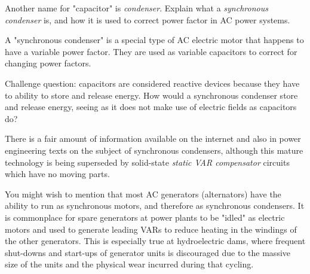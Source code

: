 

Another name for "capacitor" is {\it condenser}.  Explain what a {\it synchronous condenser} is, and how it is used to correct power factor in AC power systems.







A "synchronous condenser" is a special type of AC electric motor that happens to have a variable power factor.  They are used as variable capacitors to correct for changing power factors.

\vskip 10pt

Challenge question: capacitors are considered reactive devices because they have to ability to store and release energy.  How would a synchronous condenser store and release energy, seeing as it does not make use of electric fields as capacitors do?







There is a fair amount of information available on the internet and also in power engineering texts on the subject of synchronous condensers, although this mature technology is being superseded by solid-state {\it static VAR compensator} circuits which have no moving parts.

You might wish to mention that most AC generators (alternators) have the ability to run as synchronous motors, and therefore as synchronous condensers.  It is commonplace for spare generators at power plants to be "idled" as electric motors and used to generate leading VARs to reduce heating in the windings of the other generators.  This is especially true at hydroelectric dams, where frequent shut-downs and start-ups of generator units is discouraged due to the massive size of the units and the physical wear incurred during that cycling.




